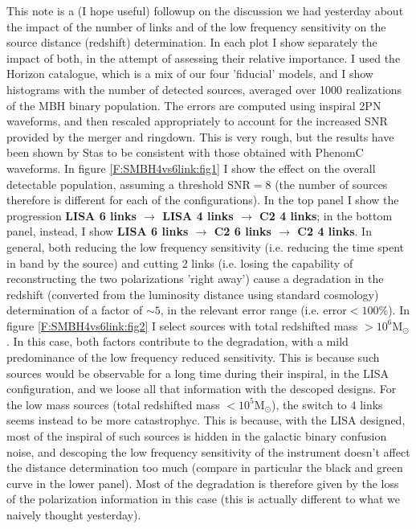 \documentclass{iopart}
\begin{document}
This note is a (I hope useful) followup on the discussion we had yesterday about the impact of the number of links and of the low frequency sensitivity on the source distance (redshift) determination. In each plot I show separately the impact of both, in the attempt of assessing their relative importance. I used the Horizon catalogue, which is a mix of our four 'fiducial' models, and I show histograms with the number of detected sources, averaged over 1000 realizations of the MBH binary population. The errors are computed using inspiral 2PN waveforms, and then rescaled appropriately to account for the increased SNR provided by the merger and ringdown. This is very rough, but the results have been shown by Stas to be consistent with those obtained with PhenomC waveforms. In figure \ref{F:SMBH4vs6link:fig1} I show the effect on the overall detectable population, assuming a threshold SNR$=8$ (the number of sources therefore is different for each of the configurations). In the top panel I show the progression {\bf LISA 6 links $\rightarrow$ LISA 4 links $\rightarrow$ C2 4 links}; in the bottom panel, instead, I show {\bf LISA 6 links $\rightarrow$ C2 6 links $\rightarrow$ C2 4 links}. In general, both reducing the low frequency sensitivity (i.e. reducing the time spent in band by the source) and cutting 2 links (i.e. losing the capability of reconstructing the two polarizations 'right away') cause a degradation in the redshift (converted from the luminosity distance using standard cosmology) determination of a factor of $\sim5$, in the relevant error range (i.e. error$<100\%$). In figure \ref{F:SMBH4vs6link:fig2} I select sources with total redshifted mass $>10^6$M$_\odot$. In this case, both factors contribute to the degradation, with a mild predominance of the low frequency reduced sensitivity. This is because such sources would be observable for a long time during their inspiral, in the LISA configuration, and we loose all that information with the descoped designs. For the low mass sources (total redshifted mass $<10^5$M$_\odot$), the switch to 4 links seems instead to be more catastrophyc. This is because, with the LISA designed, most of the inspiral of such sources is hidden in the galactic binary confusion noise, and descoping the low frequency sensitivity of the instrument doesn't affect the distance determination too much (compare in particular the black and green curve in the lower panel). Most of the degradation is therefore given by the loss of the polarization information in this case (this is actually different to what we naively thought yesterday).
\end{document}
